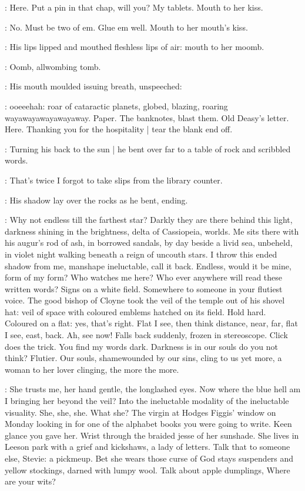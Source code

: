 \StephenInt:
Here.
Put a pin in that chap, will you?
My tablets.
Mouth to her kiss.

\StephenInt:
No.
Must be two of em.
Glue em well.
Mouth to her mouth's kiss.

:
His lips lipped and mouthed fleshless lips of air:
mouth to her moomb.

\StephenInt:
Oomb, allwombing tomb.

:
His mouth moulded issuing breath, unspeeched:

\StephenInt:
ooeeehah:
roar of cataractic planets, globed, blazing,
roaring wayawayawayawayaway.
Paper.
The banknotes, blast them.
Old Deasy's letter.
Here.
Thanking you for the hospitality |
tear the blank end off.

:
Turning his back to the sun |
he bent over far to a table of rock and scribbled words.

\StephenInt:
That's twice I forgot to take slips from the library counter.

:
His shadow lay over the rocks as he bent, ending.

\StephenInt:
Why not endless till the farthest star?
Darkly they are there behind this light,
darkness shining in the brightness,
delta of Cassiopeia, worlds.
Me sits there with his augur's rod of ash,
in borrowed sandals,
by day beside a livid sea,
unbeheld, in violet night
walking beneath a reign of uncouth stars.
I throw this ended shadow from me, manshape ineluctable, call it back.
Endless, would it be mine, form of my form?
Who watches me here?
Who ever anywhere will read these written words?
Signs on a white field.
Somewhere to someone in your flutiest voice.
The good bishop of Cloyne took the veil of the temple
out of his shovel hat:
veil of space with coloured emblems
hatched on its field.
Hold hard.
Coloured on a flat:
yes, that's right.
Flat I see, then think distance,
near, far, flat I see, east, back.
Ah, see now!
Falls back suddenly, frozen in stereoscope.
Click does the trick.
You find my words dark.
Darkness is in our souls do you not think?
Flutier.
Our souls, shamewounded by our sins, cling to us yet more,
a woman to her lover clinging, the more the more.

\StephenInt:
She trusts me, her hand gentle, the longlashed eyes.
Now where the blue hell am I bringing her beyond the veil?
Into the ineluctable modality
of the ineluctable visuality.
She, she, she.
What she?
The virgin at Hodges Figgis' window on Monday looking in
for one of the alphabet books you were going to write.
Keen glance you gave her.
Wrist through the braided jesse of her sunshade.
She lives in Leeson park with a grief and kickshaws, a lady of letters.
Talk that to someone else,
Stevie:
a pickmeup.
Bet she wears those curse of God stays
suspenders and yellow stockings, darned with lumpy wool.
Talk about apple dumplings,
Where are your wits?

